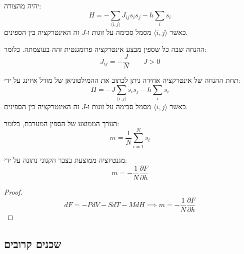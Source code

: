 \documentclass{tstextbook}
\begin{document}
\begin{definition}
יהיה מהצורה:
$$H=-\sum_{\langle i,j\rangle}J_{ij}s_{i}s_{j}-h\sum_{i}s_{i}$$
כאשר \(\langle i,j \rangle\) מסמל סכימה על זוגות ו-\(J\) זה האינטרקציה בין הספינים.

\end{definition}
\begin{definition}
ההנחה שבה כל שספין מבצע אינטרקציה פרומגנטית זהה בעוצמתה. כלומר:
$$J_{i j}=-\frac{J}{N}\qquad J> 0$$

\end{definition}
\begin{corollary}
תחת ההנחה של אינטרקציה אחידה ניתן לכתוב את ההמילטוניאן של מודל איזינג על ידי:
$$H=-J\sum_{\langle i,j\rangle}s_{i}s_{j}-h\sum_{i}s_{i}$$
כאשר \(\langle i,j \rangle\) מסמל סכימה על זוגות ו-\(J\) זה האינטרקציה בין הספינים.

\end{corollary}
\begin{definition}
הערך הממוצע של הספין המערכת, כלומר:
$$m=\frac{1}{N}\sum_{i=1}^{N}s_{i}$$

\end{definition}
\begin{corollary}
מגנטיזציה ממוצעת בצבר הקנוני נתונה על ידי:
$$m=-\frac{1}{N}\frac{\partial F}{\partial h} $$

\end{corollary}
\begin{proof}
$$d F=-P d V-S d T-M d H\implies m=-\frac{1}{N}\frac{\partial F}{\partial h}$$

\end{proof}
\subsection{שכנים קרובים}
\end{document}
